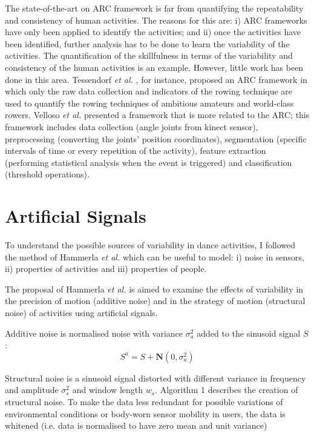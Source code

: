 \documentclass[10pt,journal,compsoc]{IEEEtran}
\begin{document}
The state-of-the-art on ARC framework is far from 
quantifying the repeatability and consistency of human activities.
The reasons for this are: i) ARC frameworks have only been
applied to identify the activities; and ii) once the activities
have been identified, further analysis has to be done to
learn the variability of the activities. The quantification of 
the skillfulness in terms of the variability and consistency 
of the human activities is an example. However, little work
has been done in this area. 
Tessendorf \textit{et al.} \cite{Tessendorf2011}, for instance,
proposed an ARC framework in which only the raw data 
collection and indicators of the rowing technique are used 
to quantify the rowing techniques of ambitious amateurs 
and world-class rowers. Velloso \textit{et al.} \cite{Velloso2013a,Velloso2013b} presented
a framework that is more related to the ARC; this framework
includes data collection (angle joints from kinect sensor),
preprocessing (converting the joints' position coordinates),
segmentation (specific intervals of time or every repetition of
the activity), feature extraction (performing statistical analysis
when the event is triggered) and classification (threshold
operations).



\section{Artificial Signals}
To understand the possible sources of variability in dance activities, I
followed the method of Hammerla \textit{et al.} \cite{hammerla2011} which can be
useful to model: i) noise in sensors, ii) properties of activities and iii)
properties of people.

The proposal of Hammerla \emph{et al.} \cite{hammerla2011}
is aimed to examine the effects of
variability in the precision of motion  (additive noise) 
and in the strategy of motion  (structural noise) of 
activities using artificial signals.

Additive noise is normalised noise with variance $\sigma_a ^2$ added to the
sinusoid signal $S$: 
\begin{equation}
 S^a = S + \textbf{N}(0, \sigma_a ^2)
\end{equation} 

Structural noise is a sinusoid signal distorted with different variance 
in frequency and amplitude $\sigma_s ^2$ and window length $w_s$. 
Algorithm 1 describes the creation of structural noise.
To make the data less redundant for possible variations of environmental 
conditions or body-worn sensor mobility in users, the data is whitened 
(i.e. data is normalised to have zero mean and unit variance) 
\end{document}
